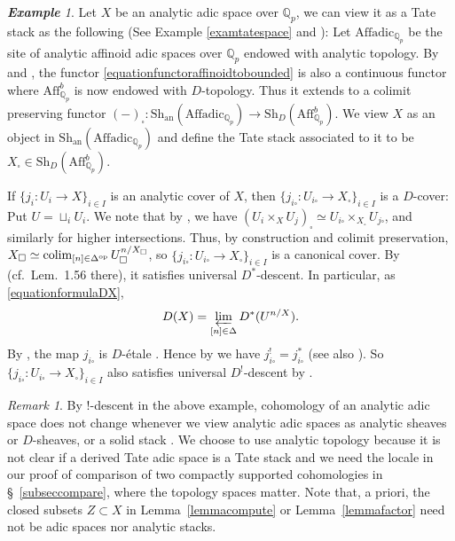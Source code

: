 \documentclass[a4paper,10pt]{amsart}
\theoremstyle{remark}
\newtheorem{example}[theorem]{\bf Example}
\newtheorem{remark}[theorem]{Remark}
\theoremstyle{definition}
\theoremstyle{plain}
\numberwithin{equation}{section}
\newcommand{\bbQ}{{\mathbb Q}}
\newcommand{\AffQp}{{\mathrm{Aff}^b_{\mathbb{Q}_p}}}
\newcommand{\Sh}{{\mathrm{Sh}}}
\DeclareMathOperator{\colim}{colim}
\begin{document}
\begin{example}\label{exampleopencoverDcover}
Let $X$ be an analytic adic space over $\bbQ_p$, we can view it as a Tate stack as the following (See Example \ref{examtatespace} and \cite[\S~1.3]{mikami2026finiteness}): Let $\mathrm{Affadic}_{\bbQ_p}$ be the site of analytic affinoid adic spaces over $\bbQ_p$ endowed with analytic topology. By \cite[Prop.~4.12]{andreychev2021pseudocoherent} and \cite[Lem.~3.2.9]{camargo2024analytic}, the functor \eqref{equationfunctoraffinoidtobounded} is also a continuous functor where $ \AffQp$ is now endowed with $D$-topology. Thus it extends to a colimit preserving functor $(-)_\square: \Sh_{\mathrm{an}}(\mathrm{Affadic}_{\bbQ_p})\to \Sh_D(\AffQp)$. We view $X$ as an object in $\Sh_{\mathrm{an}}(\mathrm{Affadic}_{\bbQ_p})$ and define the Tate stack associated to it to be $X_\square\in \Sh_D(\AffQp)$. 
 
If $\{j_i:U_i\to X\}_{i\in I}$ is an analytic cover of $X$, then $\{j_{i\square}: U_{i\square}\to X_\square\}_{i\in I}$ is a $D$-cover: Put $U=\sqcup_i U_i$. We note that by \cite[Exam.~1.55]{mikami2026finiteness}, we have $(U_i\times_X U_j)_\square\simeq U_{i\square}\times_{X_\square} U_{j\square}$, and similarly for higher intersections. Thus, by construction and colimit preservation, $X_{\square}\simeq\colim_{[n]\in \Delta^{\rm op}}U_{\square}^{n/X_\square}$, so $\{j_{i\square}: U_{i\square}\to X_\square\}_{i\in I}$ is a canonical cover. By \cite[Rem.~1.15]{mikami2026finiteness} (cf.\ Lem.~1.56 there), it satisfies universal $D^*$-descent. In particular, as \eqref{equationformulaDX},
\begin{equation*}
	D(X)=\varprojlim_{[n]\in \Delta}D^{*}(U^{n/X}).
\end{equation*}
By \cite[Lem.~1.57]{mikami2026finiteness}, the map $j_{i\square}$ is $D$-\'etale \cite[Def.~4.6.1]{heyer20246functor}. Hence by \cite[Lem.~4.6.4(i)]{heyer20246functor} we have $j_{i\square}^!=j_{i\square}^*$ (see also \cite[\S~4.7]{meyerWagner2024qHodge}). So $\{j_{i\square}: U_{i\square}\to X_\square\}_{i\in I}$ also satisfies universal $D^!$-descent by \cite[Lem.~4.7.1]{heyer20246functor}.
\end{example}
 
\begin{remark}
By $!$-descent in the above example, cohomology of an analytic adic space does not change whenever we view analytic adic spaces as analytic sheaves or $D$-sheaves, or a solid stack \cite[Def.~3.2.7]{camargo2024analytic}. We choose to use analytic topology because it is not clear if a derived Tate adic space is a Tate stack and we need the locale in our proof of comparison of two compactly supported cohomologies in \S~\ref{subseccompare}, where the topology spaces matter. Note that, a priori, the closed subsets $Z\subset X$ in Lemma~\ref{lemmacompute} or Lemma~\ref{lemmafactor} need not be adic spaces nor analytic stacks.
\end{remark}
  
\end{document}

